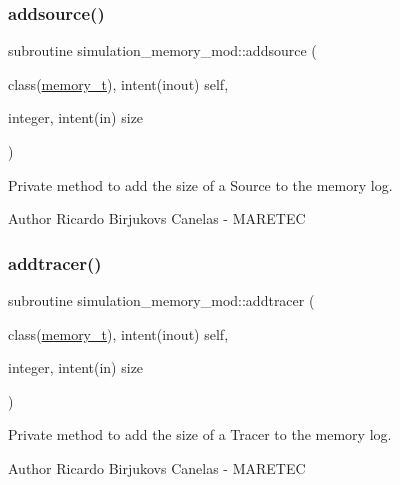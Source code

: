 \subsubsection{\texorpdfstring{addsource()}{addsource()}}
{\footnotesize\ttfamily subroutine simulation\+\_\+memory\+\_\+mod\+::addsource (\begin{DoxyParamCaption}\item[{class(\hyperlink{structsimulation__memory__mod_1_1memory__t}{memory\+\_\+t}), intent(inout)}]{self,  }\item[{integer, intent(in)}]{size }\end{DoxyParamCaption})\hspace{0.3cm}{\ttfamily [private]}}



Private method to add the size of a Source to the memory log. 

\begin{DoxyAuthor}{Author}
Ricardo Birjukovs Canelas -\/ M\+A\+R\+E\+T\+EC 
\end{DoxyAuthor}
\mbox{\label{namespacesimulation__memory__mod_a5770021491589bbd61ea112d113a9c9d}} 
\subsubsection{\texorpdfstring{addtracer()}{addtracer()}}
{\footnotesize\ttfamily subroutine simulation\+\_\+memory\+\_\+mod\+::addtracer (\begin{DoxyParamCaption}\item[{class(\hyperlink{structsimulation__memory__mod_1_1memory__t}{memory\+\_\+t}), intent(inout)}]{self,  }\item[{integer, intent(in)}]{size }\end{DoxyParamCaption})\hspace{0.3cm}{\ttfamily [private]}}



Private method to add the size of a Tracer to the memory log. 

\begin{DoxyAuthor}{Author}
Ricardo Birjukovs Canelas -\/ M\+A\+R\+E\+T\+EC 
\end{DoxyAuthor}
\mbox{\label{namespacesimulation__memory__mod_acf04d6b930ed3ffbc0950afd86033c51}} 
